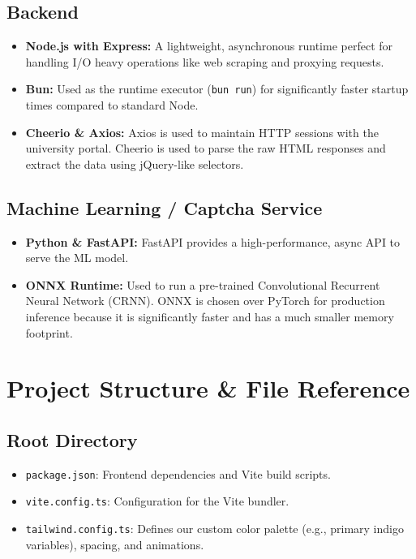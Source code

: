 \documentclass[11pt,a4paper]{article}
\begin{document}
\subsection{Backend}
\begin{itemize}
    \item \textbf{Node.js with Express:} A lightweight, asynchronous runtime perfect for handling I/O heavy operations like web scraping and proxying requests.
    \item \textbf{Bun:} Used as the runtime executor (\texttt{bun run}) for significantly faster startup times compared to standard Node.
    \item \textbf{Cheerio \& Axios:} Axios is used to maintain HTTP sessions with the university portal. Cheerio is used to parse the raw HTML responses and extract the data using jQuery-like selectors.
\end{itemize}

\subsection{Machine Learning / Captcha Service}
\begin{itemize}
    \item \textbf{Python \& FastAPI:} FastAPI provides a high-performance, async API to serve the ML model.
    \item \textbf{ONNX Runtime:} Used to run a pre-trained Convolutional Recurrent Neural Network (CRNN). ONNX is chosen over PyTorch for production inference because it is significantly faster and has a much smaller memory footprint.
\end{itemize}

\section{Project Structure \& File Reference}
\subsection{Root Directory}
\begin{itemize}
    \item \texttt{package.json}: Frontend dependencies and Vite build scripts.
    \item \texttt{vite.config.ts}: Configuration for the Vite bundler.
    \item \texttt{tailwind.config.ts}: Defines our custom color palette (e.g., primary indigo variables), spacing, and animations.
\end{itemize}
\end{document}
